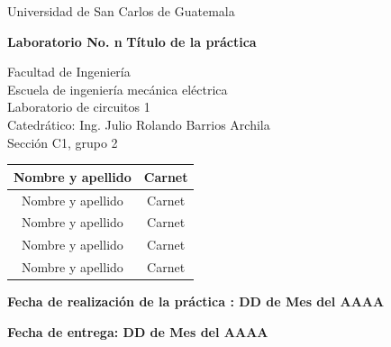 \documentclass[osajnl,showpacs,superscriptaddress,10pt]{article}
\begin{document}
\begin{center}
\begin{Large}
Universidad de San Carlos de Guatemala
\end{Large}
\end{center}



\begin{center}
\begin{Huge}
\textbf{Laboratorio No. n}
\textbf{Título de la práctica}
\end{Huge}
\end{center}



\begin{center}
\begin{normalsize}
Facultad de Ingeniería\\
Escuela de ingeniería mecánica eléctrica\\
Laboratorio de circuitos 1\\
Catedrático: Ing. Julio Rolando Barrios Archila\\
Sección C1, grupo 2\\
\end{normalsize}
\end{center}


\begin{table}[H]
\begin{center}
\begin{tabular}{c c}
\hline 
Nombre y apellido & Carnet \\ 
\hline 
Nombre y apellido & Carnet \\ 
\hline 
Nombre y apellido &  Carnet \\ 
\hline 
Nombre y apellido & Carnet \\ 
\hline 
Nombre y apellido & Carnet \\ 
\hline 
\end{tabular} 
\end{center}
\end{table}



\begin{center}
\textbf{Fecha de realización de la práctica : DD de Mes del AAAA}
\end{center}
\begin{center}
\textbf{Fecha de entrega: DD de Mes del AAAA}
\end{center}




\clearpage
\end{document}
